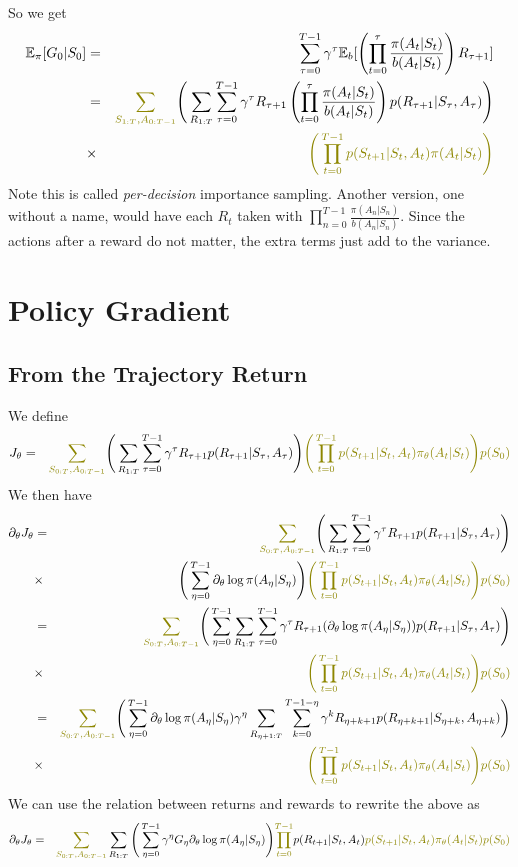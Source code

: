 \documentclass[11pt,a4paper]{article}
\newcommand\bea{\begin{eqnarray}}
\newcommand\eea{\end{eqnarray}}
\newcommand{\nn}{\nonumber \\}
\newcommand{\partitionfunctionintegrandtheta}{{\color{olive} \Bigg(  \prod_{t=0}^{T-1} p(S_{t+1}|S_t,A_t) \pi_\theta(A_t|S_t) \Bigg) p(S_0) }}
\newcommand{\partitionfunctionintegral}{{\color{olive} \sum_{S_{0:T}, A_{0:T-1}}}}
\newcommand{\partitionfunctionintegrandsecond}{{\color{olive} \Bigg(  \prod_{t=0}^{T-1} p(S_{t+1}|S_t,A_t) \pi(A_t|S_t) \Bigg) }}
\newcommand{\partitionfunctionintegralsecond}{{\color{olive} \sum_{S_{1:T}, A_{0:T-1}}}}
\begin{document}
So we get
\bea
\mathbb  E_\pi [ G_0|S_0] &=& \sum_{\tau=0}^{T-1} \gamma^\tau \mathbb E_{b}[ \left( \prod_{t=0}^{\tau} \frac{\pi(A_{t} | S_{t} )}{b(A_{t} | S_{t} )} \right)   R_{\tau+1}]  \nn
&=& \partitionfunctionintegralsecond  \Bigg( \sum_{R_{1:T}} \sum_{\tau=0}^{T-1} \gamma^\tau R_{\tau+1} \left( \prod_{t=0}^{\tau} \frac{\pi(A_{t} | S_{t} )}{b(A_{t} | S_{t} )} \right) p(R_{\tau+1}|S_\tau,A_\tau) \Bigg)  \nn
&\times& \partitionfunctionintegrandsecond \nn
\eea
Note this is called {\em per-decision} importance sampling. Another version, one without a name, would have each $R_t$ taken with $\prod_{n=0}^{T-1} \frac{\pi(A_n|S_n)}{b(A_n|S_n)}$. Since the actions after a reward do not matter, the extra terms just add to the variance.

\section{Policy Gradient}

\subsection{From the Trajectory Return}

We define
\bea
J_\theta &=& \partitionfunctionintegral  \Bigg( \sum_{R_{1:T}} \sum_{\tau=0}^{T-1} \gamma^\tau R_{\tau+1} p(R_{\tau+1}| S_\tau,A_\tau) \Bigg) \partitionfunctionintegrandtheta  \nn
\eea
We then have
\bea
\partial_\theta J_\theta &=& \partitionfunctionintegral  \Bigg( \sum_{R_{1:T}} \sum_{\tau=0}^{T-1} \gamma^\tau R_{\tau+1} p(R_{\tau+1}| S_\tau,A_\tau)  \Bigg)  \nn
&\times& \Bigg( \sum_{\eta=0}^{T-1} \partial_\theta \log \pi(A_\eta |S_\eta) \Bigg) \partitionfunctionintegrandtheta \nn
&=& \partitionfunctionintegral  \Bigg( \sum_{\eta=0}^{T-1}  \sum_{R_{1:T}} \sum_{\tau=0}^{T-1} \gamma^\tau R_{\tau+1}  (\partial_\theta \log \pi(A_\eta |S_\eta) ) p(R_{\tau+1}| S_\tau,A_\tau)  \Bigg)  \nn
&\times&  \partitionfunctionintegrandtheta \nn
&=& \partitionfunctionintegral  \Bigg( \sum_{\eta=0}^{T-1} \partial_\theta \log \pi(A_\eta |S_\eta) \gamma^\eta \sum_{R_{\eta+1:T}} \sum_{k=0}^{T-1-\eta}  \gamma^k R_{\eta+k+1}   p(R_{\eta+k+1}| S_{\eta+k},A_{\eta+k})  \Bigg)  \nn
&\times&  \partitionfunctionintegrandtheta 
 \eea
 We can use the relation between returns and rewards to rewrite the above as
 \bea
  \partial_\theta J_\theta &=& \partitionfunctionintegral  \sum_{R_{1:T}}   \Bigg( \sum_{\eta=0}^{T-1} \gamma^\eta G_\eta \partial_\theta \log \pi(A_\eta|S_\eta) \Bigg) {\color{olive} \prod_{t=0}^{T-1} } p(R_{t+1}|S_t,A_t) {\color{olive}p(S_{t+1}|S_t,A_t) \pi_\theta(A_t|S_t) p(S_0)} \nn
\eea
\end{document}
